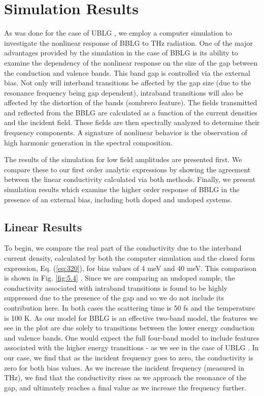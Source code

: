 \documentclass[twocolumn,secnumarabic,amssymb, nobibnotes, aps, prd, superscriptaddress]{revtex4-1}
\begin{document}
\section{Simulation Results}\label{sec:3}
As was done for the case of UBLG \cite{mcgouran2016nonlinear}, we employ a computer simulation to investigate the nonlinear response of BBLG to THz radiation. One of the major advantages provided by the simulation in the case of BBLG is its ability to examine the dependency of the nonlinear response on the size of the gap between the conduction and valence bands. This band gap is controlled via the external bias. Not only will interband transitions be affected by the gap size (due to the resonance frequency being gap dependent), intraband transitions will also be affected by the distortion of the bands (sombrero feature). The fields transmitted and reflected from the BBLG are calculated as a function of the current densities and the incident field. These fields are then spectrally analyzed to determine their frequency components. A signature of nonlinear behavior is the observation of  high harmonic generation in the spectral composition.

The results of the simulation for low field amplitudes are presented first. We compare these to our first order analytic expressions by showing the agreement between the linear conductivity calculated via both methods.  Finally, we present simulation results which examine the higher order response of BBLG in the presence of an external bias, including both doped and undoped systems.

\subsection{Linear Results}
To begin, we compare the real part of the conductivity due to the interband current density, calculated by both the computer simulation and the closed form expression, Eq. (\ref{eq:320}), for bias values of 4 meV and 40 meV. This comparison is shown in Fig. \ref{fig:5.4} . Since we are comparing an undoped sample, the conductivity associated with intraband transitions is found to be highly suppressed due to the presence of the gap and so we do not include its contribution here. In both cases the scattering time is 50 fs and the temperature is 100 K. As our model for BBLG is an effective two-band model, the features we see in the plot are due solely to transitions between the lower energy conduction and valence bands. One would expect the full four-band model to include features associated with the higher energy transitions - as we see in the case of UBLG \cite{mcgouran2016nonlinear}. In our case, we find that as the incident frequency goes to zero, the conductivity is zero for both bias values. As we increase the incident frequency (measured in THz), we find that the conductivity rises as we approach the resonance of the gap, and ultimately reaches a final value as we increase the frequency further. 
\end{document}
